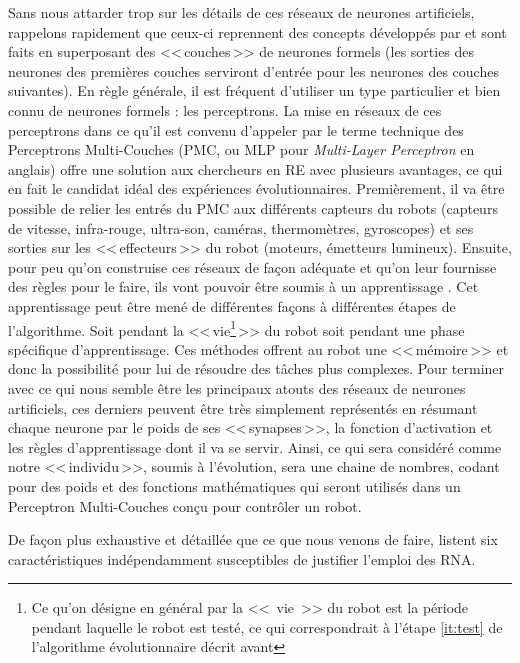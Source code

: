 Sans nous attarder trop sur les détails de ces réseaux de neurones artificiels, rappelons rapidement que ceux-ci reprennent des concepts développés par \citep{mcculloch1943alogicalcideaimmanervacti} et sont faits en superposant des <<\,couches\,>> de neurones formels (les sorties des neurones des premières couches serviront d'entrée pour les neurones des couches suivantes). En règle générale, il est fréquent d'utiliser un type particulier et bien connu de neurones formels : les perceptrons. La mise en réseaux de ces perceptrons dans ce qu'il est convenu d'appeler par le terme technique des Perceptrons Multi-Couches (PMC, ou MLP pour \emph{Multi-Layer Perceptron} en anglais) offre une solution aux chercheurs en RE avec plusieurs avantages, ce qui en fait le candidat idéal des expériences évolutionnaires. Premièrement, il va être possible de relier les entrés du PMC aux différents capteurs du robots (capteurs de vitesse, infra-rouge, ultra-son, caméras, thermomètres, gyroscopes) et ses sorties sur les <<\,effecteurs\,>> du robot (moteurs, émetteurs lumineux). Ensuite, pour peu qu'on construise ces réseaux de façon adéquate et qu'on leur fournisse des règles pour le faire, ils vont pouvoir être soumis à un apprentissage \citep[p. 30-39]{nolfi00evolrobobiolintetechselfmach}. Cet apprentissage peut être mené de différentes façons à différentes étapes de l'algorithme. Soit pendant la <<\,vie\footnote{Ce qu'on désigne en général par la <<~vie~>> du robot est la période pendant laquelle le robot est testé, ce qui correspondrait à l'étape \ref{it:test} de l'algorithme évolutionnaire décrit avant}\,>> du robot soit pendant une phase spécifique d'apprentissage. Ces méthodes offrent au robot une <<\,mémoire\,>> et donc la possibilité pour lui de résoudre des tâches plus complexes. Pour terminer avec ce qui nous semble être les principaux atouts des réseaux de neurones artificiels, ces derniers peuvent être très simplement représentés en résumant chaque neurone par le poids de ses <<\,synapses\,>>, la fonction d'activation et les règles d'apprentissage dont il va se servir. Ainsi, ce qui sera considéré comme notre <<\,individu\,>>, soumis à l'évolution, sera une chaine de nombres, codant pour des poids et des fonctions mathématiques qui seront utilisés dans un Perceptron Multi-Couches conçu pour contrôler un robot.

De façon plus exhaustive et détaillée que ce que nous venons de faire, \citet[p. 39]{nolfi00evolrobobiolintetechselfmach} listent six caractéristiques indépendamment susceptibles de justifier l'emploi des RNA.

